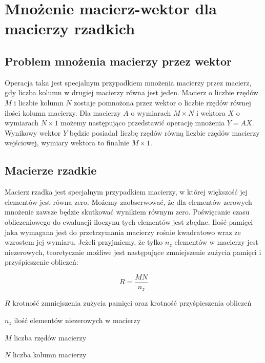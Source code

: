 \chapter{Mnożenie macierz-wektor dla macierzy rzadkich}
\label{cha:macierzwektor}

\section{Problem mnożenia macierzy przez wektor}
\label{sec:mnozeniemacierzwektor}

Operacja taka jest specjalnym przypadkiem mnożenia macierzy przez macierz, gdy liczba kolumn w drugiej macierzy równa jest jeden.
Macierz o liczbie rzędów $M$ i liczbie kolumn $N$ zostaje pomnożona przez wektor o liczbie rzędów równej ilości kolumn macierzy.
Dla macierzy $A$ o wymiarach $M \times N$ i wektora $X$ o wymiarach $N \times 1$ możemy następująco przedstawić operację mnożenia $Y = AX$.
Wynikowy wektor $Y$ będzie posiadał liczbę rzędów równą liczbie rzędów macierzy wejściowej, wymiary wektora to finalnie $M \times 1$.

\section{Macierze rzadkie}
\label{sec:macierzerzadkie}

Macierz rzadka jest specjalnym przypadkiem macierzy, w której większość jej elementów jest równa zero.
Możemy zaobserwować, że dla elementów zerowych mnożenie zawsze będzie skutkować wynikiem równym zero.
Poświęcanie czasu obliczeniowego do ewaluacji iloczynu tych elementów jest zbędne.
Ilość pamięci jaka wymagana jest do przetrzymania macierzy rośnie kwadratowo wraz ze wzrostem jej wymiaru.
Jeżeli przyjmiemy, że tylko $n_z$ elementów w macierzy jest niezerowych, teoretycznie możliwe jest następujące zmniejszenie zużycia pamięci i przyśpieszenie obliczeń:

\begin{equation}
    R = \frac{M N}{n_z}
\end{equation}

\begin{eqwhere}[2cm]
	\item[$R$] krotność zmniejszenia zużycia pamięci oraz krotność przyśpieszenia obliczeń
	\item[$n_z$] ilość elementów niezerowych w macierzy
    \item[$M$] liczba rzędów macierzy
    \item[$N$] liczba kolumn macierzy
\end{eqwhere}

